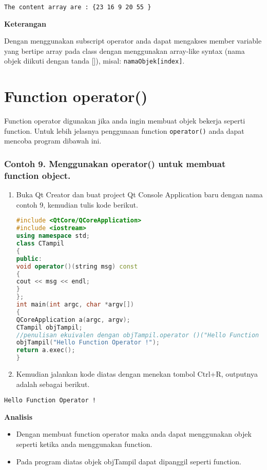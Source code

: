 \begin{verbatim}
The content array are : {23 16 9 20 55 }
\end{verbatim}

\textbf{Keterangan}

Dengan menggunakan subscript operator anda dapat mengakses member
variable yang bertipe array pada class dengan menggunakan array-like
syntax (nama objek diikuti dengan tanda {[}{]}), misal:
\texttt{namaObjek{[}index{]}}.

\section{Function operator()}\label{function-operator}

Function operator digunakan jika anda ingin membuat objek bekerja
seperti function. Untuk lebih jelasnya penggunaan function
\texttt{operator()} anda dapat mencoba program dibawah ini.

\subsubsection*{Contoh 9. Menggunakan operator() untuk membuat function object.}

\begin{enumerate}
\def\labelenumi{\arabic{enumi}.}
\item
  Buka Qt Creator dan buat project Qt Console Application baru dengan
  nama contoh 9, kemudian tulis kode berikut.

\begin{lstlisting}[language=c++]
#include <QtCore/QCoreApplication>
#include <iostream>
using namespace std;
class CTampil
{
public:
void operator()(string msg) const
{
cout << msg << endl;
}
};
int main(int argc, char *argv[])
{
QCoreApplication a(argc, argv);
CTampil objTampil;
//penulisan ekuivalen dengan objTampil.operator ()("Hello Function Operator !");
objTampil("Hello Function Operator !");
return a.exec();
}
\end{lstlisting}
\item
  Kemudian jalankan kode diatas dengan menekan tombol Ctrl+R, outputnya
  adalah sebagai berikut.
\end{enumerate}

\begin{verbatim}
Hello Function Operator !
\end{verbatim}

\textbf{Analisis}

\begin{itemize}
\tightlist
\item
  Dengan membuat function operator maka anda dapat menggunakan objek
  seperti ketika anda menggunakan function.
\item
  Pada program diatas objek objTampil dapat dipanggil seperti function.
\end{itemize}
